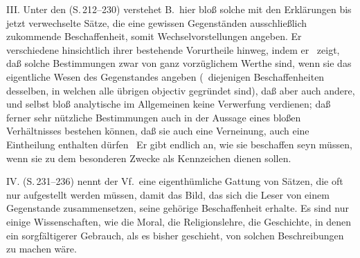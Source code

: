 III. Unter den  (S.\,212--230) verstehet B.\ hier bloß solche mit den Erklärungen bis jetzt  verwechselte Sätze, die eine gewissen Gegenständen ausschließlich zukommende Beschaffenheit, somit Wechselvorstellungen angeben. Er  verschiedene hinsichtlich ihrer bestehende Vorurtheile hinweg, indem er \zB\ zeigt, daß solche Bestimmungen zwar von ganz vorzüglichem Werthe sind, wenn sie das eigentliche Wesen des Gegenstandes angeben (\dh\  diejenigen Beschaffenheiten desselben, in welchen alle übrigen objectiv gegründet sind), daß aber auch andere, und selbst bloß analytische im Allgemeinen keine Verwerfung verdienen; daß ferner sehr nützliche Bestimmungen auch in der Aussage eines bloßen Verhältnisses bestehen können, daß sie auch eine Verneinung, auch eine Eintheilung enthalten dürfen \usw\ Er gibt endlich an, wie sie beschaffen seyn müssen, wenn sie zu dem besonderen Zwecke als Kennzeichen dienen sollen. \par 
IV.  (S.\,231--236) nennt der Vf.\ eine eigenthümliche Gattung von Sätzen, die oft nur aufgestellt werden müssen, damit das Bild, das sich die Leser von einem Gegenstande zusammensetzen, seine gehörige Beschaffenheit erhalte. Es sind nur einige Wissenschaften, wie die Moral, die Religionslehre, die Geschichte, in denen ein  sorgfältigerer Gebrauch, als es bisher geschieht, von solchen Beschreibungen zu machen wäre. \par 

